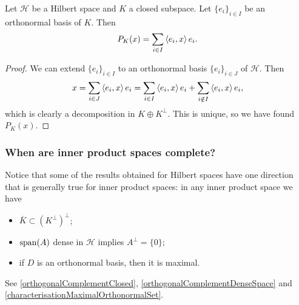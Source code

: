 \begin{lemma}
Let $\mathcal{H}$ be a Hilbert space and $K$ a closed subspace. Let $\{e_i\}_{i\in I}$ be an orthonormal basis of $K$. Then
\[ P_K(x) = \sum_{i\in I} \left\langle e_i,x \right\rangle e_i. \]
\end{lemma}
\begin{proof}
We can extend $\{e_i\}_{i\in I}$ to an orthonormal basis $\{e_i\}_{i\in J}$ of $\mathcal{H}$. Then
\[ x = \sum_{i\in J}\left\langle e_i,x \right\rangle e_i = \sum_{i\in I}\left\langle e_i,x \right\rangle e_i + \sum_{i\notin I}\left\langle e_i,x \right\rangle e_i, \]
which is clearly a decomposition in $K\oplus K^\perp$. This is unique, so we have found $P_K(x)$.
\end{proof}

\subsubsection{When are inner product spaces complete?}
Notice that some of the results obtained for Hilbert spaces have one direction that is generally true for inner product spaces: in any inner product space we have
\begin{itemize}
\item $\overline{K}\subset (K^\perp)^\perp$;
\item $\operatorname{span}(A)$ dense in $\mathcal{H}$ implies $A^\perp = \{0\}$;
\item if $D$ is an orthonormal basis, then it is maximal.
\end{itemize}
See \ref{orthogonalComplementClosed}, \ref{orthogonalComplementDenseSpace} and \ref{characterisationMaximalOrthonormalSet}.

